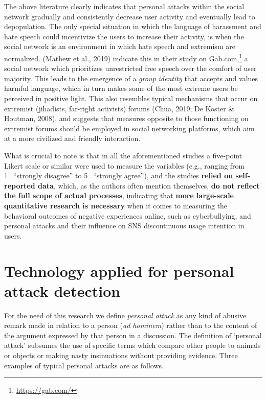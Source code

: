 \documentclass[10pt,dvipsnames]{scrartcl}
\begin{document}
The above literature clearly indicates that personal attacks within the
social network gradually and consistently decrease user activity and
eventually lead to depopulation. The only special situation in which the
language of harassment and hate speech could incentivize the users to
increase their activity, is when the social network is an environment in
which hate speech and extremism are normalized. (Mathew et al., 2019)
indicate this in their study on
Gab.com,\footnote{\url{https://gab.com/}} a social network which
prioritizes unrestricted free speech over the comfort of user majority.
This leads to the emergence of a \textit{group identity} that accepts
and values harmful language, which in turn makes some of the most
extreme users be perceived in positive light. This also resembles
typical mechanisms that occur on extremist (jihadists, far-right
activists) forums (Chua, 2019; De Koster \& Houtman, 2008), and suggests
that measures opposite to those functioning on extremist forums should
be employed in social networking platforms, which aim at a more
civilized and friendly interaction.

What is crucial to note is that in all the aforementioned studies a
five-point Likert scale or similar were used to measure the variables
(e.g., ranging from 1=``strongly disagree'' to 5=``strongly agree''),
and the studies \textbf{relied on self-reported data}, which, as the
authors often mention themselves,
\textbf{do not reflect the full scope of actual processes}, indicating
that \textbf{more large-scale quantitative research is necessary} when
it comes to measuring the behavioral outcomes of negative experiences
online, such as cyberbullying, and personal attacks and their influence
on SNS discontinuous usage intention in users.

\section{Technology applied for personal attack detection}
\label{technology}

For the need of this research we define \textit{personal attack} as any
kind of abusive remark made in relation to a person
(\textit{ad hominem}) rather than to the content of the argument
expressed by that person in a discussion. The definition of `personal
attack' subsumes the use of specific terms which compare other people to
animals or objects or making nasty insinuations without providing
evidence. Three examples of typical personal attacks are as follows.
\end{document}
